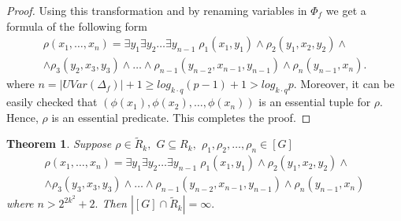 \documentclass{au}
\theoremstyle{plain}
\newtheorem{theorem}{Theorem}
\theoremstyle{definition}
\theoremstyle{remark}
\numberwithin{equation}{section}
\begin{document}
\begin{proof}
Using this transformation and by renaming variables in $\Phi_{f}$
we get a formula of the following form
\begin{multline*}\rho(x_{1},\ldots,x_{n}) = \exists y_{1}\exists y_{2}\ldots\exists y_{n-1}\;
\rho_{1}(x_{1},y_{1})\wedge
\rho_{2}(y_{1},x_{2},y_{2})\wedge \\ \wedge
\rho_{3}(y_{2},x_{3},y_{3})\wedge \ldots \wedge
\rho_{n-1}(y_{n-2},x_{n-1},y_{n-1})\wedge
\rho_{n}(y_{n-1},x_{n}).
\end{multline*}
where $n = |UVar(\Delta_{f})| +1 \ge log_{k\cdot q}(p-1) +1 > log_{k\cdot q}p.$
Moreover,
it can be easily checked that
$(\phi(x_{1}),\phi(x_{2}),\ldots,\phi(x_{n}))$ is an essential tuple for $\rho.$
Hence, $\rho$ is an essential predicate.
This completes the proof.

\end{proof}

\begin{theorem} 

Suppose $\rho \in \widetilde R_{k},$ $G\subseteq R_{k},$ $\rho_{1},\rho_{2},\ldots,\rho_{n}\in [G]$
\begin{multline*}\rho(x_{1},\ldots,x_{n}) = \exists y_{1}\exists y_{2}\ldots\exists y_{n-1}\;
\rho_{1}(x_{1},y_{1})\wedge
\rho_{2}(y_{1},x_{2},y_{2})\wedge \\ \wedge
\rho_{3}(y_{3},x_{3},y_{3})\wedge \ldots \wedge
\rho_{n-1}(y_{n-2},x_{n-1},y_{n-1})\wedge
\rho_{n}(y_{n-1},x_{n})
\end{multline*}
where $n>2^{2k^{2}}+2.$
Then $|[G] \cap \widetilde R_{k}| = \infty.$
\end{theorem}
\end{document}
